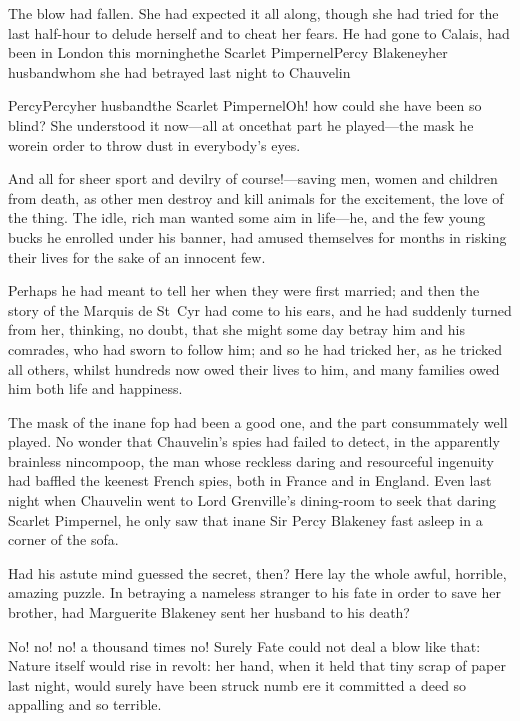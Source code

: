 The blow had fallen. She had expected it all along, though she had tried for the last half-hour to delude herself and to cheat her fears. He had gone to Calais, had been in London this morning\textellipsis \allowbreak  he\textellipsis \allowbreak  the Scarlet Pimpernel\textellipsis \allowbreak  Percy Blakeney\textellipsis \allowbreak  her husband\textellipsis \allowbreak  whom she had betrayed last night to Chauvelin\textellipsis \allowbreak 

Percy\textellipsis \allowbreak  Percy\textellipsis \allowbreak  her husband\textellipsis \allowbreak  the Scarlet Pimpernel\textellipsis \allowbreak  Oh! how could she have been so blind? She understood it now—all at once\textellipsis \allowbreak  that part he played—the mask he wore\textellipsis \allowbreak  in order to throw dust in everybody's eyes.

And all for sheer sport and devilry of course!—saving men, women and children from death, as other men destroy and kill animals for the excitement, the love of the thing. The idle, rich man wanted some aim in life—he, and the few young bucks he enrolled under his banner, had amused themselves for months in risking their lives for the sake of an innocent few.

Perhaps he had meant to tell her when they were first married; and then the story of the Marquis de St~Cyr had come to his ears, and he had suddenly turned from her, thinking, no doubt, that she might some day betray him and his comrades, who had sworn to follow him; and so he had tricked her, as he tricked all others, whilst hundreds now owed their lives to him, and many families owed him both life and happiness.

The mask of the inane fop had been a good one, and the part consummately well played. No wonder that Chauvelin's spies had failed to detect, in the apparently brainless nincompoop, the man whose reckless daring and resourceful ingenuity had baffled the keenest French spies, both in France and in England. Even last night when Chauvelin went to Lord Grenville's dining-room to seek that daring Scarlet Pimpernel, he only saw that inane Sir Percy Blakeney fast asleep in a corner of the sofa.

Had his astute mind guessed the secret, then? Here lay the whole awful, horrible, amazing puzzle. In betraying a nameless stranger to his fate in order to save her brother, had Marguerite Blakeney sent her husband to his death?

No! no! no! a thousand times no! Surely Fate could not deal a blow like that: Nature itself would rise in revolt: her hand, when it held that tiny scrap of paper last night, would surely have been struck numb ere it committed a deed so appalling and so terrible.

